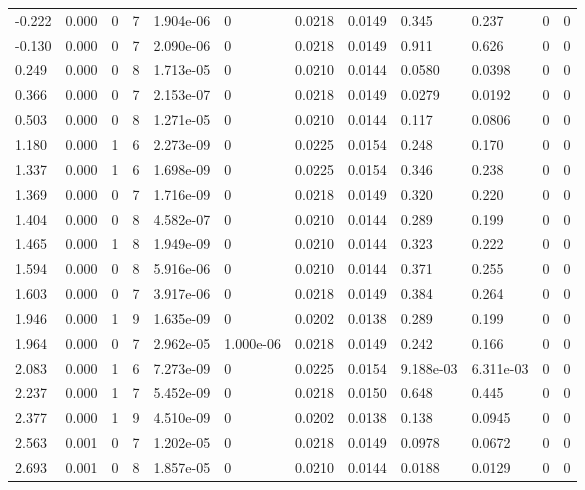 \documentclass[preview]{standalone}
\begin{document}
{{\begin{tabular}{L{1.2cm}C{1.2cm} C{0.3cm}C{0.5cm} C{1.4cm}C{1.4cm} C{1.4cm}C{1.4cm} C{1.6cm}C{1.6cm} C{1.6cm}C{1.6cm}}
  -0.222  &  0.000  & 0     &  7 &  1.904e-06  & 0  &  0.0218&   0.0149& 0.345 & 0.237   &  0 & 0  \\ 
  -0.130  &  0.000  & 0     &  7 &  2.090e-06  & 0  &  0.0218&   0.0149& 0.911 & 0.626   &  0 & 0  \\ 
  0.249  &  0.000  & 0     &  8 &  1.713e-05  & 0  &  0.0210&   0.0144& 0.0580 & 0.0398   &  0 & 0  \\ 
  0.366  &  0.000  & 0     &  7 &  2.153e-07  & 0  &  0.0218&   0.0149& 0.0279 & 0.0192   &  0 & 0  \\ 
  0.503  &  0.000  & 0     &  8 &  1.271e-05  & 0  &  0.0210&   0.0144& 0.117 & 0.0806   &  0 & 0  \\ 
  1.180  &  0.000  & 1     &  6 &  2.273e-09  & 0  &  0.0225&   0.0154& 0.248 & 0.170   &  0 & 0  \\ 
  1.337  &  0.000  & 1     &  6 &  1.698e-09  & 0  &  0.0225&   0.0154& 0.346 & 0.238   &  0 & 0  \\ 
  1.369  &  0.000  & 0     &  7 &  1.716e-09  & 0  &  0.0218&   0.0149& 0.320 & 0.220   &  0 & 0  \\ 
  1.404  &  0.000  & 0     &  8 &  4.582e-07  & 0  &  0.0210&   0.0144& 0.289 & 0.199   &  0 & 0  \\ 
  1.465  &  0.000  & 1     &  8 &  1.949e-09  & 0  &  0.0210&   0.0144& 0.323 & 0.222   &  0 & 0  \\ 
  1.594  &  0.000  & 0     &  8 &  5.916e-06  & 0  &  0.0210&   0.0144& 0.371 & 0.255   &  0 & 0  \\ 
  1.603  &  0.000  & 0     &  7 &  3.917e-06  & 0  &  0.0218&   0.0149& 0.384 & 0.264   &  0 & 0  \\ 
  1.946  &  0.000  & 1     &  9 &  1.635e-09  & 0  &  0.0202&   0.0138& 0.289 & 0.199   &  0 & 0  \\ 
  1.964  &  0.000  & 0     &  7 &  2.962e-05  & 1.000e-06  &  0.0218&   0.0149& 0.242 & 0.166   &  0 & 0  \\ 
  2.083  &  0.000  & 1     &  6 &  7.273e-09  & 0  &  0.0225&   0.0154& 9.188e-03 & 6.311e-03   &  0 & 0  \\ 
  2.237  &  0.000  & 1     &  7 &  5.452e-09  & 0  &  0.0218&   0.0150& 0.648 & 0.445   &  0 & 0  \\ 
  2.377  &  0.000  & 1     &  9 &  4.510e-09  & 0  &  0.0202&   0.0138& 0.138 & 0.0945   &  0 & 0  \\ 
  2.563  &  0.001  & 0     &  7 &  1.202e-05  & 0  &  0.0218&   0.0149& 0.0978 & 0.0672   &  0 & 0  \\ 
  2.693  &  0.001  & 0     &  8 &  1.857e-05  & 0  &  0.0210&   0.0144& 0.0188 & 0.0129   &  0 & 0  \\ 

\end{tabular}}}
\end{document}
